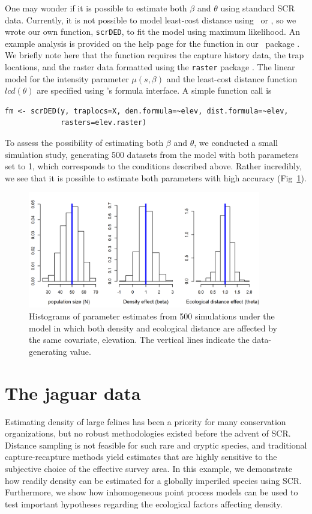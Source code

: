 One may wonder if it is possible to estimate both $\beta$
and $\theta$ using standard SCR data. Currently, it is not possible to
model least-cost distance using \jags~or \secr, so we wrote our own
function, \verb+scrDED+, to fit the model using maximum likelihood. An
example analysis is provided on the help page for the function in our
\R~package \scrbook. We briefly note here that the function requires
the capture history data, the trap locations, and the raster data
formatted using the {\tt raster} package
\citep{hijmans_vanetten:2012}. The linear model for the
intensity parameter $\mu(s, \beta)$ and the least-cost distance
function $lcd(\theta)$ are specified using \R's formula interface. A
simple function call is
\begin{verbatim}
fm <- scrDED(y, traplocs=X, den.formula=~elev, dist.formula=~elev,
             rasters=elev.raster)
\end{verbatim}
To assess the possibility of estimating both $\beta$ and $\theta$, we
conducted a small simulation study, generating 500 datasets from the
model with both parameters set to 1, which corresponds to the
conditions described above. Rather incredibly, we see that it is
possible to estimate both parameters with high accuracy
(Fig~\ref{ch9.fig.sim}).

\begin{figure}[ht]
\centering
\includegraphics[width=4in,height=2in]{Ch11/figs/scrDEDsim}
\caption{Histograms of parameter estimates from 500 simulations under
  the model in which both density and ecological distance are affected
by the same covariate, elevation. The vertical lines indicate the
data-generating value.}
\label{ch9.fig.sim}
\end{figure}



\section{The jaguar data}

Estimating density of large felines has been a priority for many
conservation organizations, but no robust methodologies existed before
the advent of SCR. Distance sampling is not feasible for such rare and
cryptic species, and traditional capture-recapture methods yield
estimates that are highly sensitive to the subjective choice of the
effective survey area. In this example, we
demonstrate how readily density can be estimated for a
globally imperiled species using SCR. Furthermore, we show how
inhomogeneous point process models can be used to test important
hypotheses regarding the ecological factors affecting density.

